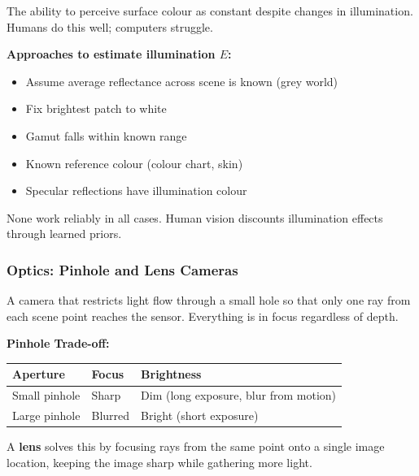 \begin{defbox}
The ability to perceive surface colour as constant despite changes in illumination. Humans do this well; computers struggle.
\end{defbox}

\textbf{Approaches to estimate illumination $E$:}
\begin{itemize}
  \item Assume average reflectance across scene is known (grey world)
  \item Fix brightest patch to white
  \item Gamut falls within known range
  \item Known reference colour (colour chart, skin)
  \item Specular reflections have illumination colour
\end{itemize}

None work reliably in all cases. Human vision discounts illumination effects through learned priors.

\bigseparator

\subsubsection{Optics: Pinhole and Lens Cameras}

\begin{defbox}
A camera that restricts light flow through a small hole so that only one ray from each scene point reaches the sensor. Everything is in focus regardless of depth.
\end{defbox}

\textbf{Pinhole Trade-off:}
\begin{center}
\renewcommand{\arraystretch}{1.3}
\begin{tabular}{@{} l l l @{}}
\toprule
\textbf{Aperture} & \textbf{Focus} & \textbf{Brightness} \\
\midrule
Small pinhole & Sharp & Dim (long exposure, blur from motion) \\
Large pinhole & Blurred & Bright (short exposure) \\
\bottomrule
\end{tabular}
\end{center}

A \textbf{lens} solves this by focusing rays from the same point onto a single image location, keeping the image sharp while gathering more light.

